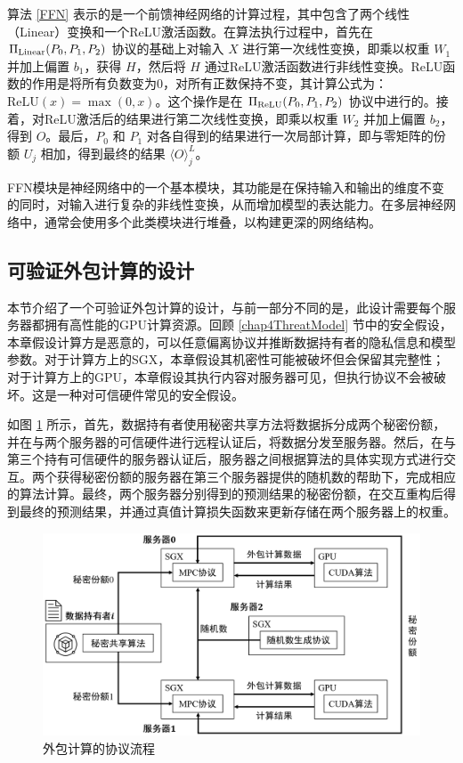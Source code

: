 算法 \ref{FFN} 表示的是一个前馈神经网络的计算过程，其中包含了两个线性（Linear）变换和一个ReLU激活函数。在算法执行过程中，首先在 $\Pi_{\rm Linear}({P_0, P_1}, P_2)$ 协议的基础上对输入 $X$ 进行第一次线性变换，即乘以权重 $W_1$ 并加上偏置 $b_1$，获得 $H$，然后将 $H$ 通过ReLU激活函数进行非线性变换。ReLU函数的作用是将所有负数变为0，对所有正数保持不变，其计算公式为：$\text{ReLU}(x) = \max(0, x)$。这个操作是在 $\Pi_{\rm ReLU}({P_0, P_1}, P_2)$ 协议中进行的。接着，对ReLU激活后的结果进行第二次线性变换，即乘以权重 $W_2$ 并加上偏置 $b_2$，得到 $O$。最后，$P_0$ 和 $P_1$ 对各自得到的结果进行一次局部计算，即与零矩阵的份额 $U_j$ 相加，得到最终的结果 $\langle O\rangle_j^L$。

FFN模块是神经网络中的一个基本模块，其功能是在保持输入和输出的维度不变的同时，对输入进行复杂的非线性变换，从而增加模型的表达能力。在多层神经网络中，通常会使用多个此类模块进行堆叠，以构建更深的网络结构。

\subsection{可验证外包计算的设计}

本节介绍了一个可验证外包计算的设计，与前一部分不同的是，此设计需要每个服务器都拥有高性能的GPU计算资源。回顾 \ref{chap4ThreatModel} 节中的安全假设，本章假设计算方是恶意的，可以任意偏离协议并推断数据持有者的隐私信息和模型参数。对于计算方上的SGX，本章假设其机密性可能被破坏但会保留其完整性；对于计算方上的GPU，本章假设其执行内容对服务器可见，但执行协议不会被破坏。这是一种对可信硬件常见的安全假设\cite{Cryptflow}。

如图 \ref{Chap4_With_GPU} 所示，首先，数据持有者使用秘密共享方法将数据拆分成两个秘密份额，并在与两个服务器的可信硬件进行远程认证后，将数据分发至服务器。然后，在与第三个持有可信硬件的服务器认证后，服务器之间根据算法的具体实现方式进行交互。两个获得秘密份额的服务器在第三个服务器提供的随机数的帮助下，完成相应的算法计算。最终，两个服务器分别得到的预测结果的秘密份额，在交互重构后得到最终的预测结果，并通过真值计算损失函数来更新存储在两个服务器上的权重。


\begin{figure}[h]
	\centering
	\includegraphics[width=\linewidth]{figures/Chap4_With_GPU.png}
	\caption{外包计算的协议流程}
	\label{Chap4_With_GPU}
\end{figure}


